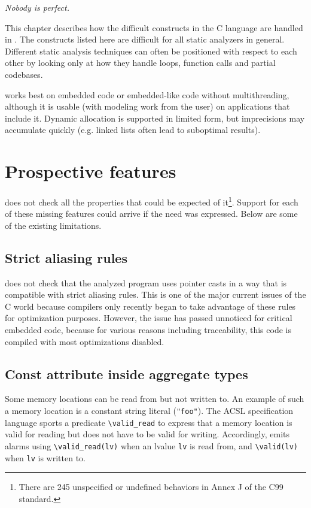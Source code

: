 \documentclass{frama-c-book}
\newcommand{\isoc}{\textsf{C99}}
\begin{document}
{\em Nobody is perfect.}

\vspace{2cm}

This chapter describes how the difficult constructs in the C language
are handled in \Eva{}. The constructs listed
here are difficult for all static analyzers in general.
Different static analysis techniques can often be positioned
with respect to each other by looking only at how they handle loops,
function calls and partial codebases.

\Eva{} works best on embedded code
or embedded-like code without multithreading,
although it is usable (with modeling work from the user) on
applications that include it. Dynamic allocation is supported in
limited form, but imprecisions may accumulate quickly
(e.g. linked lists often lead to suboptimal results).

\section{Prospective features}

\Eva{} does not check all the properties that could be
expected of it\footnote{There are 245 unspecified or undefined
  behaviors in Annex J of the \isoc{} standard.}. Support for each of
these missing features could arrive if the need was expressed. Below
are some of the existing limitations.

\subsection{Strict aliasing rules}

\Eva{} does not check that the analyzed program uses
pointer casts in a way that is compatible with strict aliasing
rules. This is one of the major current issues of the C world because
compilers only recently began to take advantage of these rules for
optimization purposes. However, the issue has passed unnoticed for
critical embedded code, because for various reasons including
traceability, this code is compiled with most optimizations disabled.

\subsection{Const attribute inside aggregate types}

Some memory locations can be read from but not written to.  An example
of such a memory location is a constant string literal
(\lstinline|"foo"|). The ACSL specification language sports a
predicate \lstinline|\valid_read| to express that a memory location is
valid for reading but does not have to be valid for writing.
Accordingly, \Eva{} emits alarms using
\lstinline|\valid_read(lv)| when an lvalue \lstinline|lv| is read from, and
\lstinline|\valid(lv)| when \lstinline|lv| is written to.
\end{document}

